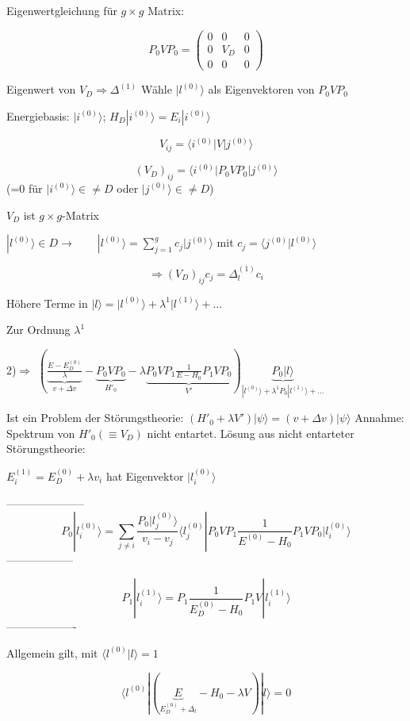 Eigenwertgleichung für \(g\times g\) Matrix:

\[ P_0 V P_0 = \begin{pmatrix} 0&0&0\\ 0&V_D&0\\0&0&0 \end{pmatrix} \]

Eigenwert von \(V_D \Rightarrow \Delta^{(1)}\) Wähle \(|l^{(0)}\rangle\) als Eigenvektoren von \(P_0VP_0\)

Energiebasis: \(|i^{(0)}\rangle\); \(H_D|i^{(0)}\rangle=E_i|i^{(0)}\rangle\)

\[ V_{ij} = \langle  i^{(0)}|V|j^{(0)}\rangle \]

\[ (V_D)_{ij} = \langle  i^{(0)}|P_0VP_0|j^{(0)}\rangle \]
(=0 für \(|i^{(0)}\rangle \in\neq D \) oder \(|j^{(0)}\rangle \in\neq D \))

\(V_D\) ist \(g\times g\)-Matrix

\(|l^{(0)}\rangle \in D \rightarrow \qquad |l^{(0)}\rangle=\sum^g_{j=1}c_j|j^{(0)}\rangle \) mit \(c_j=\langle j^{(0)}|l^{(0)}\rangle\)

\[\Rightarrow (V_D)_{ij} c_j = \Delta^{(1)}_l c_i\]

Höhere Terme in \(|l\rangle=|l^{(0)}\rangle+\lambda^1|l^{(1)}\rangle+...\)

Zur Ordnung \(\lambda^1\)

2)\(\Rightarrow\) \((\underbrace{\frac{E-E^{(0)}_D}{\lambda}}_{v+\Delta v}-\underbrace{P_0VP_0}_{H'_0}-\lambda \underbrace{P_0VP_1 \frac{1}{E-H_0}P_1VP_0}_{V'})\underbrace{P_0|l\rangle}_{|l^{(0)}\rangle+\lambda^1P_0|l^{(1)}\rangle+...}\)

Ist ein Problem der Störungstheorie: \((H'_0+\lambda V')|\psi\rangle = (v+\Delta v)|\psi\rangle\) Annahme: Spektrum von \(H'_0(\equiv V_D)\) nicht entartet. Lösung aus nicht entarteter Störungstheorie:

\( E^{(1)}_i = E^{(0)}_D + \lambda v_i\) hat Eigenvektor \(|l^{(0)}_i\rangle\)

---------------------
\[P_0|l^{(0)}_i\rangle = \sum_{j\neq i}\frac{P_0|l^{(0)}_j\rangle}{v_i - v_j}\langle l^{(0)}_j|P_0VP_1\frac{1}{E^{(0)}-H_0}P_1VP_0 |l^{(0)}_i\rangle\]
------------------

\[P_1|l^{(1)}_i\rangle = P_1 \frac{1}{E^{(0)}_D-H_0}P_1 V |l^{(1)}_i\rangle\]
-------------------

Allgemein gilt, mit \(\langle l^{(0)} |l\rangle = 1\)

\[ \langle l^{(0)}|(\underbrace{E}_{E^{(0)}_D+\Delta_l}-H_0-\lambda V) |l\rangle = 0 \]

